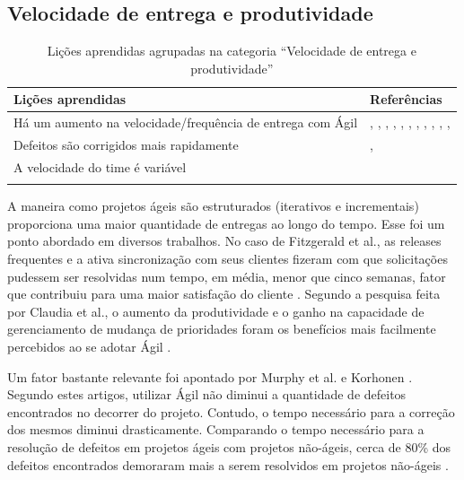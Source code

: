 \subsection{Velocidade de entrega e produtividade}

\begin{table}[H]
	\centering
	\captionsetup{justification=centering}
	\begin{tabularx}{\linewidth}{ | X | p{5cm} | } \hline \textbf{Lições aprendidas} & \textbf{Referências} \\ \hline
		Há um aumento na velocidade/frequência de entrega com Ágil & \cite{Adobe2012}, \cite{Fitzgerald2013}, \cite{Microsoft2013}, \cite{Cisco2011}, \cite{Korhonen2010}, \cite{Eunha2012}, \cite{Claudia2013}, \cite{Stefano2013}, \cite{Queiroz2013}, \cite{Maciel2013}, \cite{Hui2013}, \cite{Ahmed2008} \\ \hline
		Defeitos são corrigidos mais rapidamente & \cite{Microsoft2013}, \cite{Korhonen2010} \\ \hline
		A velocidade do time é variável & \cite{Piegas2012} \\ \hline
	\caption{Lições aprendidas agrupadas na categoria ``Velocidade de entrega e produtividade''}
	\end{tabularx}
\end{table}

A maneira como projetos ágeis são estruturados (iterativos e incrementais) proporciona uma maior quantidade de entregas ao longo do tempo. Esse foi um ponto abordado em diversos trabalhos. No caso de Fitzgerald et al., as releases frequentes e a ativa sincronização com  seus clientes fizeram com que solicitações pudessem ser resolvidas num tempo, em média, menor que cinco semanas, fator que contribuiu para uma maior satisfação do cliente \cite{Fitzgerald2013}. Segundo a pesquisa feita por Claudia et al., o aumento da produtividade e o ganho na capacidade de gerenciamento de mudança de prioridades foram os benefícios mais facilmente percebidos ao se adotar Ágil \cite{Claudia2013}.

Um fator bastante relevante foi apontado por Murphy et al. e Korhonen \cite{Microsoft2013,Korhonen2010}. Segundo estes artigos, utilizar Ágil não diminui a quantidade de defeitos encontrados no decorrer do projeto. Contudo, o tempo necessário para a correção dos mesmos diminui drasticamente. Comparando o tempo necessário para a resolução de defeitos em projetos ágeis com projetos não-ágeis, cerca de 80\% dos defeitos encontrados demoraram mais a serem resolvidos em projetos não-ágeis \cite{Korhonen2010}.

